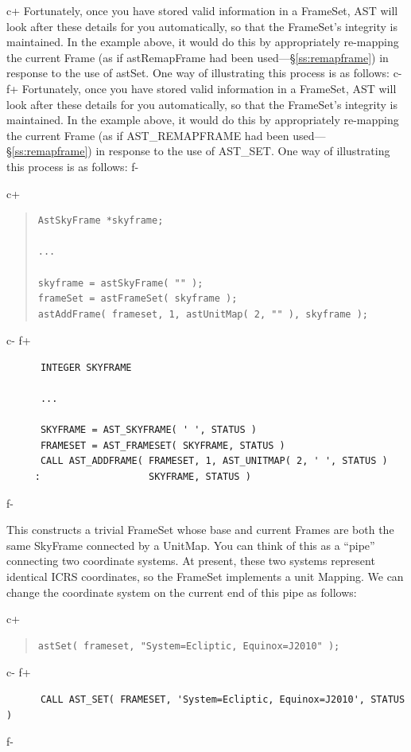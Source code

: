 \documentclass[twoside,11pt]{article}
\newcommand{\secref}[1]{\S\ref{#1}}
\newcommand{\secref}[1]{\ref{#1}}
\begin{document}
c+
Fortunately, once you have stored valid information in a FrameSet, AST
will look after these details for you automatically, so that the
FrameSet's integrity is maintained. In the example above, it would do
this by appropriately re-mapping the current Frame (as if
astRemapFrame had been used---\secref{ss:remapframe}) in response to
the use of astSet. One way of illustrating this process is as follows:
c-
f+
Fortunately, once you have stored valid information in a FrameSet, AST
will look after these details for you automatically, so that the
FrameSet's integrity is maintained. In the example above, it would do
this by appropriately re-mapping the current Frame (as if
AST\_REMAPFRAME had been used---\secref{ss:remapframe}) in response to
the use of AST\_SET. One way of illustrating this process is as
follows:
f-

c+
\begin{quote}
\small
\begin{verbatim}
AstSkyFrame *skyframe;

...

skyframe = astSkyFrame( "" );
frameSet = astFrameSet( skyframe );
astAddFrame( frameset, 1, astUnitMap( 2, "" ), skyframe );
\end{verbatim}
\normalsize
\end{quote}
c-
f+
\small
\begin{verbatim}
      INTEGER SKYFRAME

      ...

      SKYFRAME = AST_SKYFRAME( ' ', STATUS )
      FRAMESET = AST_FRAMESET( SKYFRAME, STATUS )
      CALL AST_ADDFRAME( FRAMESET, 1, AST_UNITMAP( 2, ' ', STATUS )
     :                   SKYFRAME, STATUS )
\end{verbatim}
\normalsize
f-

This constructs a trivial FrameSet whose base and current Frames are
both the same SkyFrame connected by a UnitMap. You can think of this
as a ``pipe'' connecting two coordinate systems. At present, these two
systems represent identical ICRS coordinates, so the FrameSet
implements a unit Mapping. We can change the coordinate system on the
current end of this pipe as follows:

c+
\begin{quote}
\small
\begin{verbatim}
astSet( frameset, "System=Ecliptic, Equinox=J2010" );
\end{verbatim}
\normalsize
\end{quote}
c-
f+
\small
\begin{verbatim}
      CALL AST_SET( FRAMESET, 'System=Ecliptic, Equinox=J2010', STATUS )
\end{verbatim}
\normalsize
f-
\end{document}
